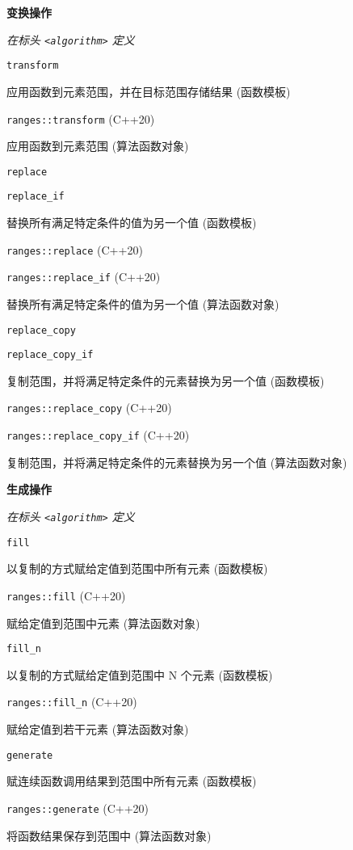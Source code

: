 \noindent \textbf{变换操作}

\textit{在标头 \lstinline{<algorithm>} 定义}

\noindent \lstinline{transform}

应⽤函数到元素范围，并在⽬标范围存储结果 (函数模板)

\noindent \lstinline{ranges::transform} (C++20)

应⽤函数到元素范围 (算法函数对象)

\noindent \lstinline{replace}

\noindent \lstinline{replace_if}

替换所有满⾜特定条件的值为另⼀个值 (函数模板)

\noindent \lstinline{ranges::replace} (C++20)

\noindent \lstinline{ranges::replace_if} (C++20)

替换所有满⾜特定条件的值为另⼀个值 (算法函数对象)

\noindent \lstinline{replace_copy}

\noindent \lstinline{replace_copy_if}

复制范围，并将满⾜特定条件的元素替换为另⼀个值 (函数模板)

\noindent \lstinline{ranges::replace_copy} (C++20)

\noindent \lstinline{ranges::replace_copy_if} (C++20)

复制范围，并将满⾜特定条件的元素替换为另⼀个值 (算法函数对象)

\noindent \textbf{生成操作}

\textit{在标头 \lstinline{<algorithm>} 定义}

\noindent \lstinline{fill}

以复制的⽅式赋给定值到范围中所有元素 (函数模板)

\noindent \lstinline{ranges::fill} (C++20)

赋给定值到范围中元素 (算法函数对象)

\noindent \lstinline{fill_n}

以复制的⽅式赋给定值到范围中 N 个元素 (函数模板)

\noindent \lstinline{ranges::fill_n} (C++20)

赋给定值到若⼲元素 (算法函数对象)

\noindent \lstinline{generate}

赋连续函数调⽤结果到范围中所有元素 (函数模板)

\noindent \lstinline{ranges::generate} (C++20)

将函数结果保存到范围中 (算法函数对象)

